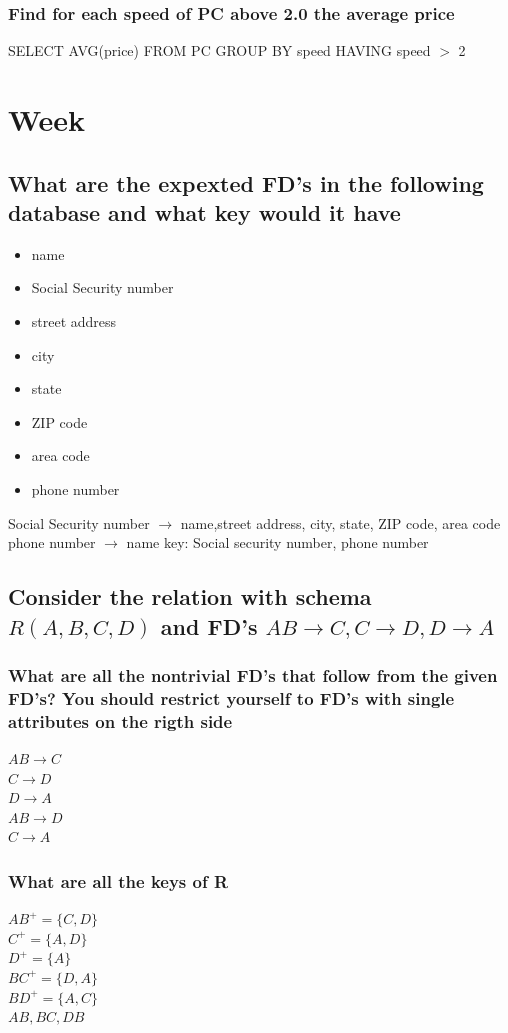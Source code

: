 \documentclass[12pt, a4paper]{article}
\begin{document}
			\subsubsection{Find for each speed of PC above 2.0 the average price}
				SELECT AVG(price) FROM PC GROUP BY speed HAVING speed $>$ 2
	\section{Week}
		\subsection{What are the expexted FD's in the following database and what key would it have}
			\begin{itemize}
				\item name
				\item Social Security number
				\item street address
				\item city
				\item state
				\item ZIP code
				\item area code
				\item phone number
			\end{itemize}
			Social Security number $\rightarrow$ name,street address, city, state, ZIP code, area code\\
			phone number $\rightarrow$ name
			key: Social security number, phone number
		\subsection{Consider the relation with schema $R(A,B,C,D)$ and FD's $AB\rightarrow C,C\rightarrow D,D\rightarrow A$}
			\subsubsection{What are all the nontrivial FD's that follow from the given FD's? You should restrict yourself to FD's with single attributes on the rigth side}
				$AB\rightarrow C$\\
				$C\rightarrow D$\\
				$D\rightarrow A$\\
				$AB\rightarrow D$\\
				$C\rightarrow A$
			\subsubsection{What are all the keys of R}
				$AB^+=\{C,D\}$\\
				$C^+=\{A,D\}$\\
				$D^+=\{A\}$\\
				$BC^+=\{D,A\}$\\
				$BD^+=\{A,C\}$\\
				$AB,BC,DB$
\end{document}
